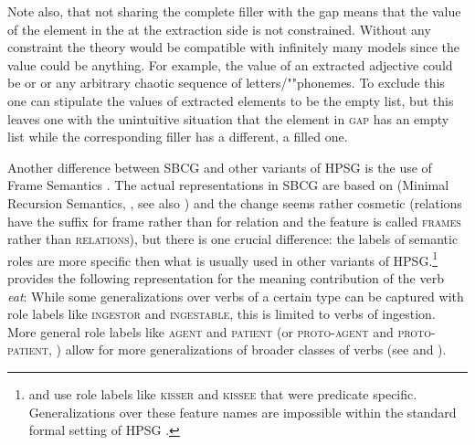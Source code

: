 \documentclass[output=paper]{langsci/langscibook}
\begin{document}
Note also, that not sharing the complete filler with the gap means that the \form
value of the element in the \argstl at the extraction side is not constrained. Without any
constraint the theory would be compatible with infinitely many models since the \form value could be
anything. For example, the \form value of an extracted adjective could be 
or  or any arbitrary chaotic sequence of letters/""phonemes. To exclude this one can stipulate the \form values of extracted
elements to be the empty list, but this leaves one with the unintuitive situation that the element
in \textsc{gap} has an empty \form list while the corresponding filler has a different, a filled one.


\label{sec-frame-semantics-SBCG}

Another difference between SBCG and other variants of HPSG is the use of Frame Semantics
\citep{Fillmore82a-u,Fillmore85b-u}. The actual representations in SBCG are based on \mrs (Minimal
Recursion Semantics, \citealt{CFPS2005a}, see also ) and
the change seems rather cosmetic (relations have the suffix  for frame rather than
 for relation and the feature is called \textsc{frames} rather than
\textsc{relations}), but there is one crucial difference: the labels of semantic roles
are more specific then what is usually used in other variants of HPSG.\footnote{
  \citet[]{ps} and \citet{ps2} use role labels like \textsc{kisser} and \textsc{kissee} that were predicate
  specific. Generalizations over these feature names are impossible within the standard formal setting of
  HPSG \parencites[Section~8.5.3]{ps2}[, Fn.~1]{Mueller99a}.
}
\citet[]{Sag2012a} provides the following representation for the meaning contribution of the
verb \emph{eat}:
\ea
{}
\z
While some generalizations over verbs of a certain type can be captured with role labels like
\textsc{ingestor} and \textsc{ingestable}, this is limited to verbs of ingestion. More general role
labels like \textsc{agent} and \textsc{patient} (or \textsc{proto-agent} and \textsc{proto-patient},
\citealt{Dowty91a}) allow for more generalizations of broader classes of verbs (see
\citealt{DK2000b-u} and ).
\end{document}
